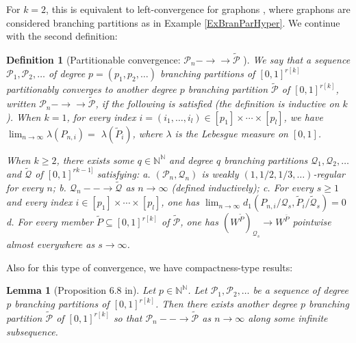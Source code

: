 \documentclass[11pt]{article}
\newtheorem{lemma}[theorem]{Lemma}
\newtheorem{definition}[theorem]{Definition}
\def\N{\mathbb{N}}
\begin{document}
For $k=2$, this is equivalent to left-convergence for  graphons \cite{LovaszGraphLimits}, where graphons are considered branching partitions as in Example \ref{ExBranParHyper}. We continue with the second definition:

\begin{definition}[Partitionable convergence: $\mathscr{P}_n-\rightarrow \rightarrow \tilde{\mathscr{P}}$ ]
We say that a sequence $\mathscr{P}_1, \mathscr{P}_2, \ldots$ of degree $p=\left(p_1, p_2, \ldots\right)$ branching partitions of $[0,1]^{r[k]}$ partitionably converges to another degree $p$ branching partition $\tilde{\mathscr{P}}$ of $[0,1]^{r[k]}$, written $\mathscr{P}_n-\rightarrow \rightarrow \tilde{\mathscr{P}}$, if the following is satisfied (the definition is inductive on $k$).
When $k=1$, for every index $i=\left(i_1, \ldots, i_l\right) \in\left[p_1\right] \times \cdots \times\left[p_l\right]$, we have $\lim _{n \rightarrow \infty} \lambda\left(P_{n, i}\right)=$ $\lambda\left(\tilde{P}_i\right)$, where $\lambda$ is the Lebesgue measure on $[0,1]$.

When $k \geq 2$, there exists some $q \in \mathbb{N}^{\mathbb{N}}$ and degree $q$ branching partitions $\mathscr{Q}_1, \mathscr{Q}_2, \ldots$  and $\tilde{\mathscr{Q}}$ of $[0,1]^{r k-1]}$ satisfying:\newline
a. $\left(\mathscr{P}_n, \mathscr{Q}_n\right)$ is weakly $(1,1 / 2,1 / 3, \ldots)$-regular for every $n$;\newline
b. $\mathscr{Q}_n--\rightarrow \tilde{\mathscr{Q}}$ as $n \rightarrow \infty$ (defined inductively); \newline
c. For every $s \geq 1$ and every index $i \in\left[p_1\right] \times \cdots \times\left[p_l\right]$, one has $\lim _{n \rightarrow \infty} d_1\left(P_{n, i} / \mathcal{Q}_s, \tilde{P}_i / \tilde{\mathcal{Q}}_s\right)=0$ \newline
d. For every member $\tilde{P} \subseteq[0,1]^{r[k]}$ of $\tilde{\mathscr{P}}$, one has $\left(W^{\tilde{P}}\right)_{\mathcal{Q}_s} \rightarrow W^{\bar{P}}$ pointwise almost everywhere as $s \rightarrow \infty$.
\end{definition}

Also for this type of convergence, we have compactness-type results:
 \begin{lemma}[Proposition 6.8 in\cite{HypergraphonsZhao}]
 Let $p\in \N^{\N}$. Let $\mathscr{P}_1, \mathscr{P}_2, \ldots$ be a sequence of degree p branching partitions of $[0,1]^{r[k]}$. Then there exists another degree $p$ branching partition $\tilde{\mathscr{P}}$ of $[0,1]^{r[k]}$ so that $\mathscr{P}_n--\rightarrow \tilde{\mathscr{P}}$ as $n\rightarrow \infty$ along some infinite subsequence.
 \end{lemma}
 
\end{document}
